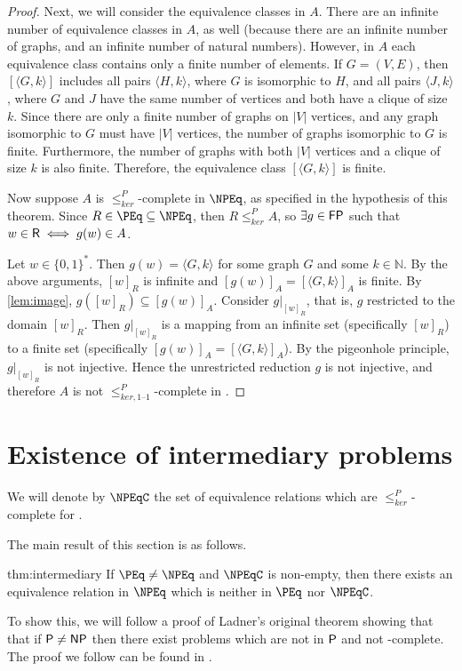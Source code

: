 \documentclass{article}
\theoremstyle{definition} \newtheorem{definition}[definition]{Definition}
\newcommand{\sigmastar}{\{0, 1\}^{*}} %
\newcommand{\kr}{\leq^{P}_{ker}} %
\newcommand{\kri}{\leq^{P}_{ker,1\text{--}1}} %
\newcommand{\pair}[2]{\langle#1,#2\rangle} %
\newcommand{\printintermediarytheorem}{If $\PEq\neq\NPEq$ and $\NPEqC$ is non-empty, then there exists an equivalence relation in $\NPEq$ which is neither in $\PEq$ nor $\NPEqC$.}
\begin{document}
\begin{proof}
  Next, we will consider the equivalence classes in $A$.
  There are an infinite number of equivalence classes in $A$, as well (because there are an infinite number of graphs, and an infinite number of natural numbers).
  However, in $A$ each equivalence class contains only a finite number of elements.
  If $G=(V,E)$, then $[\pair{G}{k}]$ includes all pairs $\pair{H}{k}$, where $G$ is isomorphic to $H$, and all pairs $\pair{J}{k}$, where $G$ and $J$ have the same number of vertices and both have a clique of size $k$.
  Since there are only a finite number of graphs on $|V|$ vertices, and any graph isomorphic to $G$ must have $|V|$ vertices, the number of graphs isomorphic to $G$ is finite.
  Furthermore, the number of graphs with both $|V|$ vertices and a clique of size $k$ is also finite.
  Therefore, the equivalence class $[\pair{G}{k}]$ is finite.

  Now suppose $A$ is $\kr$-complete in $\NPEq$, as specified in the hypothesis of this theorem.
  Since $R\in\PEq\subseteq\NPEq$, then $R\kr A$, so $\exists g\in\FP$ such that $w\in\R\iff g(w)\in A$.

  Let $w\in\sigmastar$.
  Then $g(w)=\pair{G}{k}$ for some graph $G$ and some $k\in\mathbb{N}$.
  By the above arguments, $[w]_R$ is infinite and $[g(w)]_A=[\pair{G}{k}]_A$ is finite.
  By \autoref{lem:image}, $g([w]_R)\subseteq [g(w)]_A$.
  Consider $g|_{[w]_R}$, that is, $g$ restricted to the domain $[w]_R$.
  Then $g|_{[w]_R}$ is a mapping from an infinite set (specifically $[w]_R$) to a finite set (specifically $[g(w)]_A=[\pair{G}{k}]_A$).
  By the pigeonhole principle, $g|_{[w]_R}$ is not injective.
  Hence the unrestricted reduction $g$ is not injective, and therefore $A$ is not $\kri$-complete in \NPEq.
\end{proof}

\section{Existence of intermediary problems}

We will denote by $\NPEqC$ the set of equivalence relations which are $\kr$-complete for \NPEq.

The main result of this section is as follows.
\begin{reptheorem}{thm:intermediary}
  \printintermediarytheorem
\end{reptheorem}
To show this, we will follow a proof of Ladner's original theorem showing that that if $\P\neq\NP$ then there exist problems which are not in $\P$ and not \NP-complete.
The proof we follow can be found in \cite{bdg95}.
\end{document}
